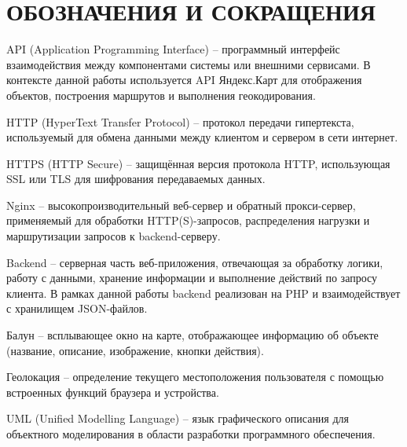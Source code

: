 \section*{ОБОЗНАЧЕНИЯ И СОКРАЩЕНИЯ}

API (Application Programming Interface) -- программный интерфейс взаимодействия между компонентами системы или внешними сервисами. В контексте данной работы используется API Яндекс.Карт для отображения объектов, построения маршрутов и выполнения геокодирования.

HTTP (HyperText Transfer Protocol) -- протокол передачи гипертекста, используемый для обмена данными между клиентом и сервером в сети интернет.

HTTPS (HTTP Secure) -- защищённая версия протокола HTTP, использующая SSL или TLS для шифрования передаваемых данных.

Nginx -- высокопроизводительный веб-сервер и обратный прокси-сервер, применяемый для обработки HTTP(S)-запросов, распределения нагрузки и маршрутизации запросов к backend-серверу.

Backend -- серверная часть веб-приложения, отвечающая за обработку логики, работу с данными, хранение информации и выполнение действий по запросу клиента. В рамках данной работы backend реализован на PHP и взаимодействует с хранилищем JSON-файлов.

Балун -- всплывающее окно на карте, отображающее информацию об объекте (название, описание, изображение, кнопки действия).

Геолокация -- определение текущего местоположения пользователя с помощью встроенных функций браузера и устройства.

UML (Unified Modelling Language) -- язык графического описания для объектного моделирования в области разработки программного обеспечения.
